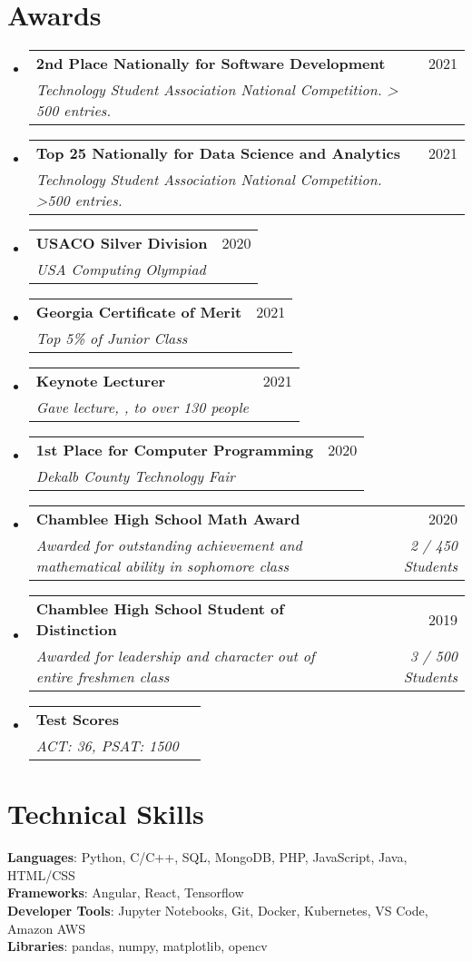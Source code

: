 \documentclass[a4paper,11pt]{article}
\makeatletter
\newcommand{\myuline}[1]{%
  \uline{\phantom{#1}}%
  \llap{\contour{white}{#1}}%
}
\newcommand{\resumeSubheading}[4]{
  \vspace{-2pt}\item
    \begin{tabular*}{0.97\textwidth}[t]{l@{\extracolsep{\fill}}r}
      \textbf{#1} & #2 \\
      \textit{\small#3} & \textit{\small #4} \\
    \end{tabular*}\vspace{-7pt}
}
\newcommand{\resumeSubHeadingListStart}{\begin{itemize}[leftmargin=0.15in, label={}]}
\newcommand{\resumeSubHeadingListEnd}{\end{itemize}}
\makeatother
\begin{document}
\section{Awards}
\resumeSubHeadingListStart
\resumeSubheading{2nd Place Nationally for Software Development}{2021}
{Technology Student Association National Competition. > 500 entries.}{}
\resumeSubheading{Top 25 Nationally for Data Science and Analytics}{2021}
{Technology Student Association National Competition. >500 entries.}{}
\resumeSubheading{USACO Silver Division}{2020}{USA Computing Olympiad}{}
\resumeSubheading{Georgia Certificate of Merit}{2021}{Top 5\% of Junior Class}{}
\resumeSubheading{Keynote Lecturer}{2021}{Gave lecture, \myuline{\href{https://github.com/Owen-Oertell/introToMLConcretePrediction/raw/main/slide.pdf}{\textbf{Introduction to Machine Learning}}}, to over 130 people}{}
\resumeSubheading{1st Place for Computer Programming}{2020}{Dekalb County Technology Fair}{}
\resumeSubheading{Chamblee High School Math Award}{2020}{Awarded for outstanding achievement and mathematical ability in sophomore class}{2 / 450 Students}
\resumeSubheading{Chamblee High School Student of Distinction}{2019}{Awarded for leadership and character out of entire freshmen class}{3 / 500 Students}
\resumeSubheading{Test Scores}{}{ACT: 36, PSAT: 1500}{}
\resumeSubHeadingListEnd

\section{Technical Skills}
\begin{itemize}[leftmargin=0.15in, label={}]
  \small{\item{
                \textbf{Languages}{: Python, C/C++, SQL, MongoDB, PHP, JavaScript, Java, HTML/CSS} \\
                \textbf{Frameworks}{: Angular, React, Tensorflow} \\
                \textbf{Developer Tools}{: Jupyter Notebooks, Git, Docker, Kubernetes, VS Code, Amazon AWS} \\
                \textbf{Libraries}{: pandas, numpy, matplotlib, opencv}
          }}
\end{itemize}

\end{document}
